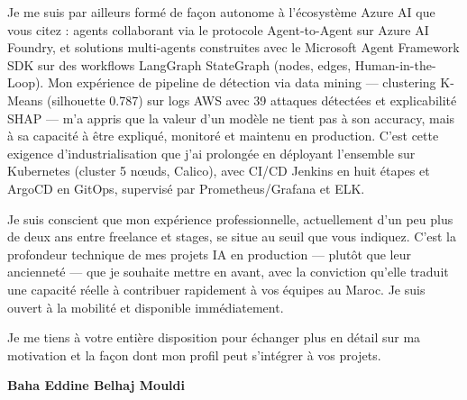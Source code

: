 \documentclass[a4paper,11pt]{article}
\begin{document}
Je me suis par ailleurs formé de façon autonome à l'écosystème Azure AI que vous citez : agents collaborant via le protocole Agent-to-Agent sur Azure AI Foundry, et solutions multi-agents construites avec le Microsoft Agent Framework SDK sur des workflows LangGraph StateGraph (nodes, edges, Human-in-the-Loop). Mon expérience de pipeline de détection via data mining — clustering K-Means (silhouette 0.787) sur logs AWS avec 39 attaques détectées et explicabilité SHAP — m'a appris que la valeur d'un modèle ne tient pas à son accuracy, mais à sa capacité à être expliqué, monitoré et maintenu en production. C'est cette exigence d'industrialisation que j'ai prolongée en déployant l'ensemble sur Kubernetes (cluster 5 nœuds, Calico), avec CI/CD Jenkins en huit étapes et ArgoCD en GitOps, supervisé par Prometheus/Grafana et ELK.

Je suis conscient que mon expérience professionnelle, actuellement d'un peu plus de deux ans entre freelance et stages, se situe au seuil que vous indiquez. C'est la profondeur technique de mes projets IA en production — plutôt que leur ancienneté — que je souhaite mettre en avant, avec la conviction qu'elle traduit une capacité réelle à contribuer rapidement à vos équipes au Maroc. Je suis ouvert à la mobilité et disponible immédiatement.

Je me tiens à votre entière disposition pour échanger plus en détail sur ma motivation et la façon dont mon profil peut s'intégrer à vos projets.

\vspace{0.8cm}

\begin{flushright}
{\bfseries Baha Eddine Belhaj Mouldi}
\end{flushright}
\end{document}
